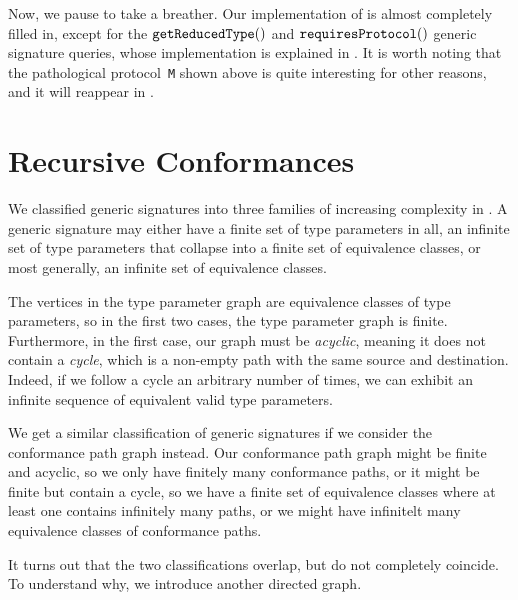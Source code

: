 \documentclass[../generics]{subfiles}
\begin{document}
Now, we pause to take a breather. Our implementation of  is almost completely filled in, except for the $\texttt{getReducedType}()$ and $\texttt{requiresProtocol}()$ generic signature queries, whose implementation is explained in . It is worth noting that the pathological protocol~\texttt{M} shown above is quite interesting for other reasons, and it will reappear in .

\section{Recursive Conformances}\label{recursive conformances}

We classified generic signatures into three families of increasing complexity in . A generic signature may either have a finite set of type parameters in all, an infinite set of type parameters that collapse into a finite set of equivalence classes, or most generally, an infinite set of equivalence classes.

The vertices in the type parameter graph are equivalence classes of type parameters, so in the first two cases, the type parameter graph is finite. Furthermore, in the first case, our graph must be \emph{acyclic}, meaning it does not contain a \emph{cycle}, which is a non-empty path with the same source and destination. Indeed, if we follow a cycle an arbitrary number of times, we can exhibit an infinite sequence of equivalent valid type parameters.

We get a similar classification of generic signatures if we consider the conformance path graph instead. Our conformance path graph might be finite and acyclic, so we only have finitely many conformance paths, or it might be finite but contain a cycle, so we have a finite set of equivalence classes where at least one contains infinitely many paths, or we might have infinitelt many equivalence classes of conformance paths.

It turns out that the two classifications overlap, but do not completely coincide. To understand why, we introduce another directed graph.
\end{document}
